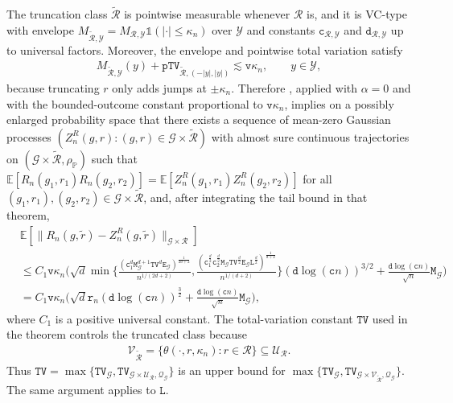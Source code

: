 \documentclass[10pt]{article}
\renewcommand{\P}{\mathbb{P}}
\newcommand{\E}{\mathbb{E}}
\newcommand{\Indicator}{\mathds{1}}
\newcommand{\G}{\mathcal{G}}
\newcommand{\Q}{\mathcal{Q}}
\newcommand{\R}{\mathcal{R}}
\newcommand{\V}{\mathcal{V}}
\newcommand{\Y}{\mathcal{Y}}
\newcommand{\ttc}{\mathtt{c}}
\newcommand{\ttd}{\mathtt{d}}
\newcommand{\ttL}{\mathtt{L}}
\newcommand{\ttM}{\mathtt{M}}
\newcommand{\ttv}{\mathtt{v}}
\newcommand{\ttTV}{\mathtt{TV}}
\begin{document}
The truncation class $\tilde{\R}$ is pointwise measurable whenever $\R$ is, and it is VC-type with envelope $M_{\tilde{\R},\Y} = M_{\R,\Y} \Indicator(|\cdot| \leq \kappa_n)$ over $\Y$ and constants $\ttc_{\R,\Y}$ and $\ttd_{\R,\Y}$ up to universal factors. Moreover, the envelope and pointwise total variation satisfy
\begin{align*}
    M_{\tilde{\R},\Y}(y) + \mathtt{pTV}_{\tilde{\R},(-|y|,|y|)} \lesssim \ttv \kappa_n, \qquad y \in \Y,
\end{align*}
because truncating $r$ only adds jumps at $\pm\kappa_n$. Therefore \citet[Theorem 2]{Cattaneo-Yu_2025_AOS}, applied with $\alpha=0$ and with the bounded-outcome constant proportional to $\ttv\kappa_n$, implies on a possibly enlarged probability space that there exists a sequence of mean-zero Gaussian processes $(Z_n^R(g,r): (g,r)\in \G\times \tilde{\R})$ with almost sure continuous trajectories on $(\G \times \tilde{\R}, \rho_{\P})$ such that $\E[R_n(g_1, r_1) R_n(g_2, r_2)] = \E[Z^R_n(g_1, r_1) Z^R_n(g_2, r_2)]$ for all $(g_1, r_1), (g_2, r_2) \in \G \times \tilde{\R}$, and, after integrating the tail bound in that theorem,
\begin{align*}
    & \E[\lVert R_n(g,\tilde{r}) - Z_n^R(g,\tilde{r}) \rVert_{\G \times \R}] \\
    & \leq C_1 \ttv \kappa_n \bigg(\sqrt{d} \min\Big\{\frac{(\ttc_1^d \ttM_{\G}^{d+1} \ttTV^d \mathtt{E}_{\G})^{\frac{1}{2d+2}} }{n^{1/(2d+2)}},
                     \frac{(\ttc_1^{\frac{d}{2}} \ttc_2^{\frac{d}{2}}\ttM_{\G} \ttTV^{\frac{d}{2}} \mathtt{E}_{\G} \ttL^{\frac{d}{2}})^{\frac{1}{d+2}}}{n^{1/(d+2)}} \Big\} (\ttd\log (\ttc n))^{3/2}
        + \frac{\ttd\log (\ttc n)}{\sqrt{n}} \ttM_{\G} \bigg) \\
    & = C_1 \ttv \kappa_n \bigg(\sqrt{d} \mathtt{r}_n (\ttd\log (\ttc n))^{\frac{3}{2}}
        + \frac{\ttd\log (\ttc n)}{\sqrt{n}} \ttM_{\G}\bigg),
\end{align*}
where $C_1$ is a positive universal constant. The total-variation constant $\ttTV$ used in the theorem controls the truncated class because
\begin{align*}
    \V_{\tilde{\R}}
    = \{\theta(\cdot,r,\kappa_n): r\in\R\}
    \subseteq \mathscr{U}_{\R}.
\end{align*}
Thus $\ttTV = \max \{\ttTV_{\G}, \ttTV_{\G \times \mathscr{U}_{\R},\Q_\G}\}$ is an upper bound for $\max \{\ttTV_{\G}, \ttTV_{\G \times \V_{\tilde{\R}},\Q_\G}\}$. The same argument applies to $\ttL$.
\end{document}
